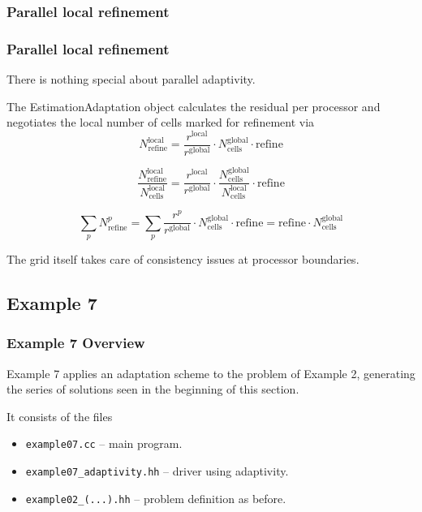 \subsubsection*{Parallel local refinement}

\begin{frame}
  \frametitle<presentation>{Parallel local refinement}

  There is nothing special about parallel adaptivity.

  The EstimationAdaptation object calculates the residual per processor and negotiates the local number of cells marked for refinement via
  \[
  N_{\text{refine}}^{\text{local}} = \frac{r^{\text{local}}}{r^{\text{global}}} \cdot N_{\text{cells}}^{\text{global}} \cdot \text{refine}
  \]

  \pause

  \[
  \frac{N_{\text{refine}}^{\text{local}}}{N_{\text{cells}}^{\text{local}}} = \frac{r^{\text{local}}}{r^{\text{global}}} \cdot \frac{N_{\text{cells}}^{\text{global}}}{N_{\text{cells}}^{\text{local}}} \cdot \text{refine}
  \]

  \pause

  \[
  \sum_{p} N_{\text{refine}}^{p} = \sum_{p}\frac{r^{p}}{r^{\text{global}}} \cdot N_{\text{cells}}^{\text{global}} \cdot \text{refine} = \text{refine} \cdot N_{\text{cells}}^{\text{global}}
  \]

  \pause

  The grid itself takes care of consistency issues at processor boundaries.
\end{frame}

\subsection{Example 7}

\begin{frame}
  \frametitle{Example 7 Overview}

  Example 7 applies an adaptation scheme to the problem of Example 2, generating the series of solutions seen in the beginning of this section.

  It consists of the files
  \begin{itemize}
    \item \lstinline{example07.cc} -- main program.
    \item \lstinline{example07_adaptivity.hh} -- driver using adaptivity.
    \item \lstinline{example02_(...).hh} -- problem definition as before.
  \end{itemize}
\end{frame}

